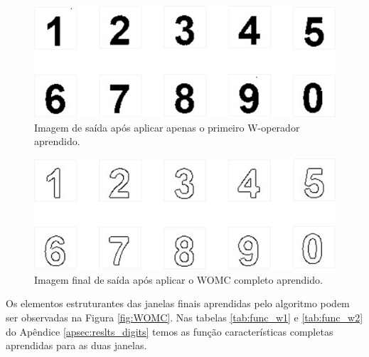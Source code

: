 \begin{figure}
    \centering
    \includegraphics[width=.4\textwidth]{figuras/digitos_output_op1.png}
    \caption{Imagem de saída após aplicar apenas o primeiro W-operador aprendido.}
    \label{fig:output_op1}
\end{figure}


\begin{figure}
    \centering
    \includegraphics[width=.4\textwidth]{figuras/digitos_output_op2.png}
    \caption{Imagem final de saída após aplicar o WOMC completo aprendido.}
    \label{fig:output_op2}
\end{figure}

Os elementos estruturantes das janelas finais aprendidas pelo algoritmo podem ser observadas na Figura \ref{fig:WOMC}. Nas tabelas \ref{tab:func_w1} e \ref{tab:func_w2} do Apêndice \ref{apsec:reslts_digits} temos as função características completas aprendidas para as duas janelas.


